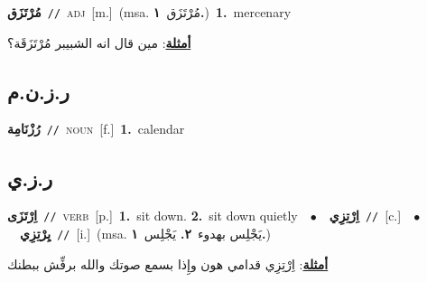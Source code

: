 \documentclass[10pt,a4paper,twoside]{article} %
\begin{document}
\begin{multicols}{2}
{\setlength\topsep{0pt}\textbf{\foreignlanguage{arabic}{مُرْتَزَق}}\ {\color{gray}\texttt{//}\color{black}}\ \textsc{adj}\ [m.]\ \color{gray}(msa. \foreignlanguage{arabic}{مُرْتَزَق}~\foreignlanguage{arabic}{\textbf{١.}})\color{black}\ \textbf{1.}~mercenary\  \begin{flushright}\color{gray}\foreignlanguage{arabic}{\textbf{\underline{\foreignlanguage{arabic}{أمثلة}}}: مين قال انه الشبيبر مُرْتَزَقَة؟}\end{flushright}\color{black}} \vspace{2mm}

\vspace{-3mm}
\subsection*{\color{blue}\foreignlanguage{arabic}{ر.ز.ن.م}\color{blue}{ (ntws)}} 

{\setlength\topsep{0pt}\textbf{\foreignlanguage{arabic}{رُزْنَامِة}}\ {\color{gray}\texttt{//}\color{black}}\ \textsc{noun}\ [f.]\ \textbf{1.}~calendar\ } \vspace{2mm}

\vspace{-3mm}
\subsection*{\color{blue}\foreignlanguage{arabic}{ر.ز.ي}\color{blue}{}} 

{\setlength\topsep{0pt}\textbf{\foreignlanguage{arabic}{اِرْتَزَى}}\ {\color{gray}\texttt{//}\color{black}}\ \textsc{verb}\ [p.]\ \textbf{1.}~sit down.  \textbf{2.}~sit down quietly\ \ $\bullet$\ \ \setlength\topsep{0pt}\textbf{\foreignlanguage{arabic}{اِرْتِزِي}}\ {\color{gray}\texttt{//}\color{black}}\ [c.]\ \ $\bullet$\ \ \setlength\topsep{0pt}\textbf{\foreignlanguage{arabic}{يِرْتِزِي}}\ {\color{gray}\texttt{//}\color{black}}\ [i.]\ \color{gray}(msa. \foreignlanguage{arabic}{يَجْلِس بهدوء}~\foreignlanguage{arabic}{\textbf{٢.}}  \foreignlanguage{arabic}{يَجْلِس}~\foreignlanguage{arabic}{\textbf{١.}})\color{black}\  \begin{flushright}\color{gray}\foreignlanguage{arabic}{\textbf{\underline{\foreignlanguage{arabic}{أمثلة}}}: اِرْتِزِي قدامي هون وإِذا بسمع صوتك والله برفِّش ببطنك}\end{flushright}\color{black}} \vspace{2mm}


\end{multicols}
\end{document}
